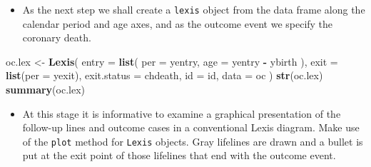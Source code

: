 \documentclass[
]{book}
\newenvironment{Shaded}{\begin{snugshade}}{\end{snugshade}}
\newcommand{\AttributeTok}[1]{\textcolor[rgb]{0.13,0.29,0.53}{#1}}
\newcommand{\ConstantTok}[1]{\textcolor[rgb]{0.56,0.35,0.01}{#1}}
\newcommand{\DecValTok}[1]{\textcolor[rgb]{0.00,0.00,0.81}{#1}}
\newcommand{\FunctionTok}[1]{\textcolor[rgb]{0.13,0.29,0.53}{\textbf{#1}}}
\newcommand{\NormalTok}[1]{#1}
\newcommand{\OtherTok}[1]{\textcolor[rgb]{0.56,0.35,0.01}{#1}}
\newcommand{\SpecialCharTok}[1]{\textcolor[rgb]{0.81,0.36,0.00}{\textbf{#1}}}
\providecommand{\tightlist}{%
  \setlength{\itemsep}{0pt}\setlength{\parskip}{0pt}}
\begin{document}
\begin{itemize}
\tightlist
\item
  As the next step we shall create a \texttt{lexis} object
  from the data frame along the calendar period and age axes,
  and as the outcome event we specify the coronary death.
\end{itemize}

\begin{Shaded}
\begin{Highlighting}[]
\NormalTok{oc.lex }\OtherTok{\textless{}{-}} \FunctionTok{Lexis}\NormalTok{(}
  \AttributeTok{entry =} \FunctionTok{list}\NormalTok{(}
    \AttributeTok{per =}\NormalTok{ yentry,}
    \AttributeTok{age =}\NormalTok{ yentry }\SpecialCharTok{{-}}\NormalTok{ ybirth}
\NormalTok{  ),}
  \AttributeTok{exit =} \FunctionTok{list}\NormalTok{(}\AttributeTok{per =}\NormalTok{ yexit),}
  \AttributeTok{exit.status =}\NormalTok{ chdeath,}
  \AttributeTok{id =}\NormalTok{ id, }\AttributeTok{data =}\NormalTok{ oc}
\NormalTok{)}
\FunctionTok{str}\NormalTok{(oc.lex)}
\FunctionTok{summary}\NormalTok{(oc.lex)}
\end{Highlighting}
\end{Shaded}

\begin{itemize}
\tightlist
\item
  At this stage it is informative to examine a graphical
  presentation of the follow-up lines and outcome cases in a conventional
  Lexis diagram. Make use of the \texttt{plot} method for \texttt{Lexis} objects.
  Gray lifelines are drawn and a bullet is put at the exit point of those lifelines
  that end with the outcome event.
\end{itemize}

\begin{Shaded}
\end{Shaded}
\end{document}
